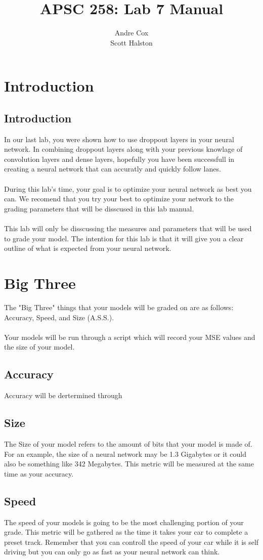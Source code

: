 \documentclass[11pt]{report}
\title{APSC 258: Lab 7 Manual}
\author{Andre Cox \\ Scott Halston}
\begin{document}
\maketitle
\tableofcontents

\clearpage

\chapter{Introduction}
\section{Introduction}
In our last lab, you were shown how to use droppout layers in your neural network. In combining droppout layers along with your previous knowlage of convolution layers and dense layers, hopefully you have been successfull in creating a neural network that can accuratly and quickly follow lanes.
\\ \\
During this lab's time, your goal is to optimize your neural network as best you can. We recomend that you try your best to optimize your network to the grading parameters that will be disscused in this lab manual.
\\ \\
This lab will only be disscussing the measures and parameters that will be used to grade your model. The intention for this lab is that it will give you a clear outline of what is expected from your neural network.

\chapter{Big Three}
The "Big Three" things that your models will be graded on are as follows:
\\
\indent Accuracy, Speed, and Size (A.S.S.).
\\ \\
Your models will be run through a script which will record your MSE values and the size of your model.

\section{Accuracy}
Accuracy will be dertermined through 

\section{Size}
The Size of your model refers to the amount of bits that your model is made of. For an example, the size of a neural network may be 1.3 Gigabytes or it could also be something like 342 Megabytes.
This metric will be measured at the same time as your accuracy.

\section{Speed}
The speed of your models is going to be the most challenging portion of your grade. This metric will be gathered as the time it takes your car to complete a preset track. Remember that you can controll the speed of your car while it is self driving but you can only go as fast as your neural network can think. 
\end{document}
